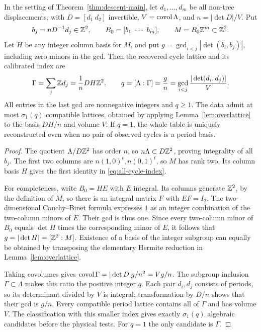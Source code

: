 \begin{theorem}\label{thm:all-cycle-index}
In the setting of Theorem~\ref{thm:descent-main}, let
$d_1,\ldots,d_m$ be all non-tree displacements, with
$D=[d_1\ d_2]$ invertible, $V=\operatorname{covol}\Lambda$, and
$n=|\det D|/V$. Put
\begin{equation}\label{eq:integer-columns}
 b_j=nD^{-1}d_j\in\mathbb Z^2,\qquad
 B_0=[b_1\ \cdots\ b_m],\qquad
 M=B_0\mathbb Z^m\subset\mathbb Z^2.
\end{equation}
Let $H$ be any integer column basis for $M$, and put
$g=\gcd_{i<j}|\det(b_i,b_j)|$, including zero minors in the gcd.
Then the recovered cycle lattice and its calibrated index are
\begin{equation}\label{eq:all-cycle-index}
 \Gamma=\sum_j\mathbb Z d_j=\frac1nDH\mathbb Z^2,\qquad
 q=[\Lambda:\Gamma]=\frac gn
    =\gcd_{i<j}\frac{|\det(d_i,d_j)|}{V}.
\end{equation}
All entries in the last gcd are nonnegative integers and $q\ge1$.
The data admit at most $\sigma_1(q)$ compatible lattices, obtained by
applying Lemma~\ref{lem:overlattice} to the basis $DH/n$ and volume $V$.
If $q=1$, the whole table is uniquely reconstructed even when no pair
of observed cycles is a period basis.
\end{theorem}
\begin{proof}
The quotient $\Lambda/D\mathbb Z^2$ has order $n$, so $n\Lambda\subset
D\mathbb Z^2$, proving integrality of all $b_j$. The first two columns are
$n(1,0)^t,n(0,1)^t$, so $M$ has rank two. Its column basis $H$ gives
the first identity in \eqref{eq:all-cycle-index}.

For completeness, write $B_0=HE$ with $E$ integral. Its columns
generate $\mathbb Z^2$, by the definition of $M$, so there is an integral
matrix $F$ with $EF=I_2$. The two-dimensional Cauchy--Binet formula
expresses $1$ as an integer combination of the two-column minors of $E$.
Their gcd is thus one. Since every two-column minor of $B_0$ equals
$\det H$ times the corresponding minor of $E$, it follows that
$g=|\det H|=[\mathbb Z^2:M]$. Existence of a basis of the integer subgroup
can equally be obtained by transposing the elementary Hermite reduction
in Lemma~\ref{lem:overlattice}.

Taking covolumes gives
$\operatorname{covol}\Gamma=|\det D|g/n^2=Vg/n$. The subgroup inclusion
$\Gamma\subset\Lambda$ makes this ratio the positive integer $q$.
Each pair $d_i,d_j$ consists of periods, so its determinant divided by
$V$ is integral; transformation by $D/n$ shows that their gcd is $g/n$.
Every compatible period lattice contains all of $\Gamma$ and has
volume $V$. The classification with this smaller index gives exactly
$\sigma_1(q)$ algebraic candidates before the physical tests. For
$q=1$ the only candidate is $\Gamma$.
\end{proof}

